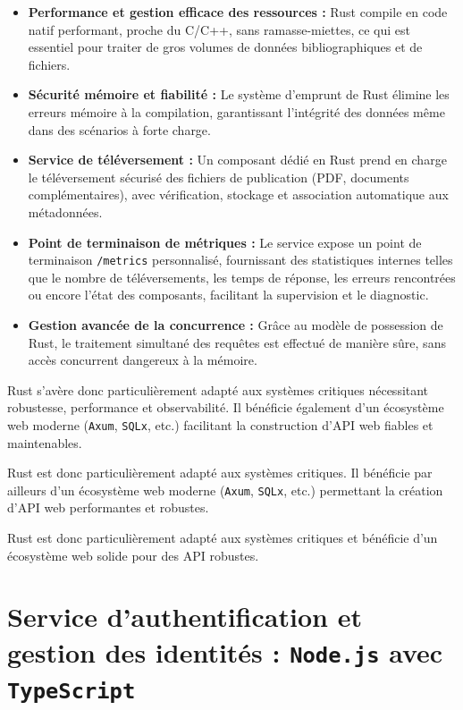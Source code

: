 \documentclass[12pt]{rapportPfe}
\begin{document}
\begin{itemize}
    \item \textbf{Performance et gestion efficace des ressources :} Rust compile en code natif performant, proche du C/C++, sans ramasse-miettes, ce qui est essentiel pour traiter de gros volumes de données bibliographiques et de fichiers.
    \item \textbf{Sécurité mémoire et fiabilité :} Le système d’emprunt de Rust élimine les erreurs mémoire à la compilation, garantissant l’intégrité des données même dans des scénarios à forte charge.
    \item \textbf{Service de téléversement :} Un composant dédié en Rust prend en charge le téléversement sécurisé des fichiers de publication (PDF, documents complémentaires), avec vérification, stockage et association automatique aux métadonnées.
    \item \textbf{Point de terminaison de métriques :} Le service expose un point de terminaison \texttt{/metrics} personnalisé, fournissant des statistiques internes telles que le nombre de téléversements, les temps de réponse, les erreurs rencontrées ou encore l’état des composants, facilitant la supervision et le diagnostic.
    \item \textbf{Gestion avancée de la concurrence :} Grâce au modèle de possession de Rust, le traitement simultané des requêtes est effectué de manière sûre, sans accès concurrent dangereux à la mémoire.
\end{itemize}

Rust s’avère donc particulièrement adapté aux systèmes critiques nécessitant robustesse, performance et observabilité. Il bénéficie également d’un écosystème web moderne (\texttt{Axum}, \texttt{SQLx}, etc.) facilitant la construction d’API web fiables et maintenables.

Rust est donc particulièrement adapté aux systèmes critiques. Il bénéficie par ailleurs d’un écosystème web moderne (\texttt{Axum}, \texttt{SQLx}, etc.) permettant la création d’API web performantes et robustes.

Rust est donc particulièrement adapté aux systèmes critiques et bénéficie d’un écosystème web solide pour des API robustes.

\section{Service d’authentification et gestion des identités : \texttt{Node.js} avec \texttt{TypeScript}}
\end{document}
